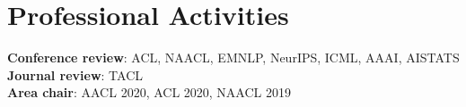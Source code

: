 \documentclass[a4paper,11pt]{article}
\begin{document}
\section{Professional Activities}
\textbf{Conference review}: ACL, NAACL, EMNLP, NeurIPS, ICML, AAAI, AISTATS \\
\textbf{Journal review}: TACL \\
\textbf{Area chair}: AACL 2020, ACL 2020, NAACL 2019
\end{document}
